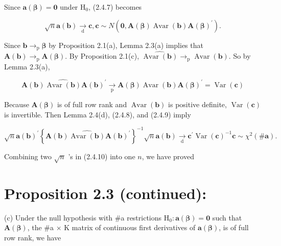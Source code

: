 \documentclass[10pt]{article}
\begin{document}
Since $\mathbf{a}(\boldsymbol{\beta})=\mathbf{0}$ under $\mathrm{H}_{0}$, (2.4.7) becomes


\begin{equation*}
\sqrt{n} \mathbf{a}(\mathbf{b}) \underset{\mathrm{d}}{\rightarrow} \mathbf{c}, \mathbf{c} \sim N\left(\mathbf{0}, \mathbf{A}(\boldsymbol{\beta}) \operatorname{Avar}(\mathbf{b}) \mathbf{A}(\boldsymbol{\beta})^{\prime}\right) . \tag{2.4.8}
\end{equation*}


Since $\mathbf{b} \rightarrow_{\mathrm{p}} \boldsymbol{\beta}$ by Proposition 2.1(a), Lemma 2.3(a) implies that $\mathbf{A}(\mathbf{b}) \rightarrow_{\mathrm{p}} \mathbf{A}(\boldsymbol{\beta})$. By Proposition 2.1(c), $\widehat{\operatorname{Avar}(\mathbf{b})} \rightarrow_{\mathrm{p}} \operatorname{Avar}(\mathbf{b})$. So by Lemma 2.3(a),


\begin{equation*}
\mathbf{A}(\mathbf{b}) \widehat{\operatorname{Avar}(\mathbf{b})} \mathbf{A}(\mathbf{b})^{\prime} \underset{\mathrm{p}}{\rightarrow} \mathbf{A}(\boldsymbol{\beta}) \operatorname{Avar}(\mathbf{b}) \mathbf{A}(\boldsymbol{\beta})^{\prime}=\operatorname{Var}(\mathbf{c}) \tag{2.4.9}
\end{equation*}


Because $\mathbf{A}(\boldsymbol{\beta})$ is of full row rank and $\operatorname{Avar}(\mathbf{b})$ is positive definite, $\operatorname{Var}(\mathbf{c})$ is invertible. Then Lemma 2.4(d), (2.4.8), and (2.4.9) imply


\begin{equation*}
\sqrt{n} \mathbf{a}(\mathbf{b})^{\prime}\left\{\mathbf{A}(\mathbf{b}) \widehat{\operatorname{Avar}(\mathbf{b})} \mathbf{A}(\mathbf{b})^{\prime}\right\}^{-1} \sqrt{n} \mathbf{a}(\mathbf{b}) \underset{\mathrm{d}}{\rightarrow} \mathbf{c}^{\prime} \operatorname{Var}(\mathbf{c})^{-1} \mathbf{c} \sim \chi^{2}(\# \mathbf{a}) . \tag{2.4.10}
\end{equation*}


Combining two $\sqrt{n}$ 's in (2.4.10) into one $n$, we have proved

\section*{Proposition 2.3 (continued):}
(c) Under the null hypothesis with \#a restrictions $\mathrm{H}_{0}: \mathbf{a}(\boldsymbol{\beta})=\mathbf{0}$ such that $\mathbf{A}(\boldsymbol{\beta})$, the \#a × K matrix of continuous first derivatives of $\mathbf{a}(\boldsymbol{\beta})$, is of full row rank, we have
\end{document}

